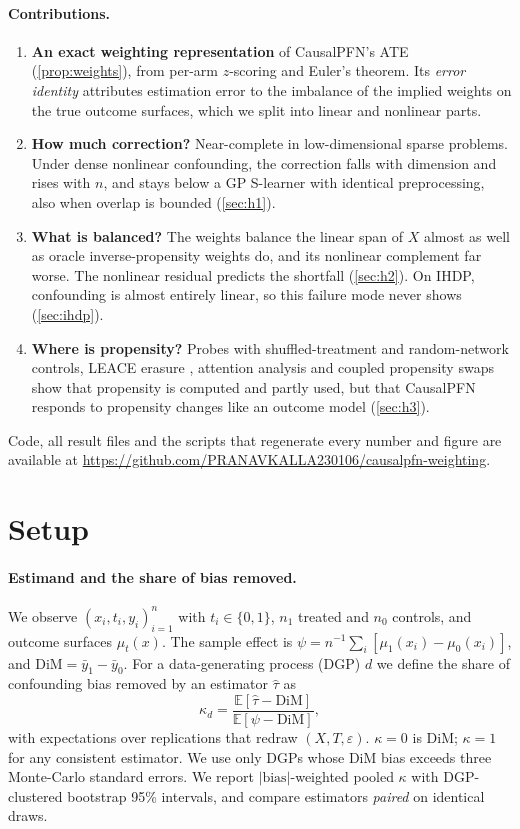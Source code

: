 \documentclass{article}
\newcommand{\DiM}{\mathrm{DiM}}
\newcommand{\that}{\hat\tau}
\begin{document}
\paragraph{Contributions.}
\begin{enumerate}
\item \textbf{An exact weighting representation} of CausalPFN's ATE (\cref{prop:weights}), from per-arm $z$-scoring and Euler's theorem. Its \emph{error identity} attributes estimation error to the imbalance of the implied weights on the true outcome surfaces, which we split into linear and nonlinear parts.
\item \textbf{How much correction?} Near-complete in low-dimensional sparse problems. Under dense nonlinear confounding, the correction falls with dimension and rises with $n$, and stays below a GP S-learner with identical preprocessing, also when overlap is bounded (\cref{sec:h1}).
\item \textbf{What is balanced?} The weights balance the linear span of $X$ almost as well as oracle inverse-propensity weights do, and its nonlinear complement far worse. The nonlinear residual predicts the shortfall (\cref{sec:h2}). On IHDP, confounding is almost entirely linear, so this failure mode never shows (\cref{sec:ihdp}).
\item \textbf{Where is propensity?} Probes with shuffled-treatment and random-network controls, LEACE erasure \citep{belrose2023leace}, attention analysis and coupled propensity swaps show that propensity is computed and partly used, but that CausalPFN responds to propensity changes like an outcome model (\cref{sec:h3}).
\end{enumerate}
Code, all result files and the scripts that regenerate every number and figure are available at \url{https://github.com/PRANAVKALLA230106/causalpfn-weighting}.

\section{Setup}\label{sec:setup}
\paragraph{Estimand and the share of bias removed.}
We observe $(x_i, t_i, y_i)_{i=1}^n$ with $t_i\in\{0,1\}$, $n_1$ treated and $n_0$ controls, and outcome surfaces $\mu_t(x)$. The sample effect is $\psi = n^{-1}\sum_i[\mu_1(x_i)-\mu_0(x_i)]$, and $\DiM = \bar y_1 - \bar y_0$. For a data-generating process (DGP) $d$ we define the share of confounding bias removed by an estimator $\that$ as
\begin{equation}
\kappa_d = \frac{\mathbb{E}[\that - \DiM]}{\mathbb{E}[\psi - \DiM]},
\end{equation}
with expectations over replications that redraw $(X, T, \varepsilon)$. $\kappa=0$ is DiM; $\kappa=1$ for any consistent estimator. We use only DGPs whose DiM bias exceeds three Monte-Carlo standard errors. We report $|\text{bias}|$-weighted pooled $\kappa$ with DGP-clustered bootstrap 95\% intervals, and compare estimators \emph{paired} on identical draws.
\end{document}
